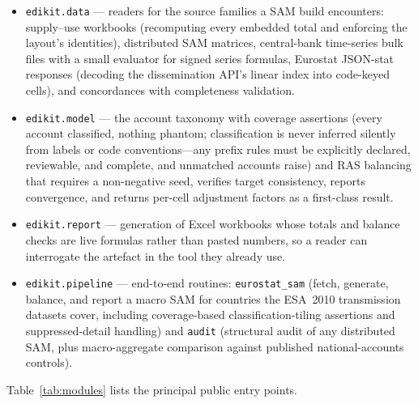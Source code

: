 \documentclass[11pt,a4paper]{article}
\begin{document}
\begin{itemize}
  \item \texttt{edikit.data} --- readers for the source families a SAM
  build encounters: supply--use workbooks (recomputing every embedded
  total and enforcing the layout's identities), distributed SAM
  matrices, central-bank time-series bulk files with a small evaluator
  for signed series formulas, Eurostat JSON-stat responses (decoding the
  dissemination API's linear index into code-keyed cells), and
  concordances with completeness validation.
  \item \texttt{edikit.model} --- the account taxonomy with coverage
  assertions (every account classified, nothing phantom; classification
  is never inferred silently from labels or code conventions---any
  prefix rules must be explicitly declared, reviewable, and complete,
  and unmatched accounts raise) and RAS balancing that requires
  a non-negative seed, verifies target consistency, reports convergence,
  and returns per-cell adjustment factors as a first-class result.
  \item \texttt{edikit.report} --- generation of Excel workbooks whose
  totals and balance checks are live formulas rather than pasted
  numbers, so a reader can interrogate the artefact in the tool they
  already use.
  \item \texttt{edikit.pipeline} --- end-to-end routines:
  \texttt{eurostat\_sam} (fetch, generate, balance, and report a macro
  SAM for countries the ESA~2010 transmission datasets cover, including
  coverage-based classification-tiling assertions and
  suppressed-detail handling) and \texttt{audit} (structural audit of
  any distributed SAM, plus macro-aggregate comparison against published
  national-accounts controls).
\end{itemize}

Table~\ref{tab:modules} lists the principal public entry points.
\end{document}
